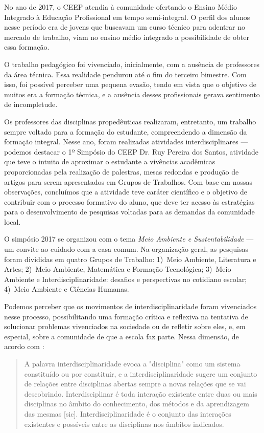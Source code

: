 \begin{refsection}
    No ano de 2017, o CEEP atendia à comunidade ofertando o Ensino Médio Integrado à Educação Profissional em tempo semi-integral. O perfil dos alunos nesse período era de jovens que buscavam um curso técnico para adentrar no mercado de trabalho, viam no ensino médio integrado a possibilidade de obter essa formação.

    O trabalho pedagógico foi vivenciado, inicialmente, com a ausência de professores da área técnica. Essa realidade pendurou até o fim do terceiro bimestre. Com isso, foi possível perceber uma pequena evasão, tendo em vista que o objetivo de muitos era a formação técnica, e a ausência desses profissionais gerava sentimento de incompletude.  

    Os professores das disciplinas propedêuticas realizaram, entretanto, um trabalho sempre voltado para a formação do estudante, compreendendo a dimensão da formação integral. Nesse ano, foram realizadas atividades interdisciplinares --- podemos destacar o 1º Simpósio do CEEP Dr. Ruy Pereira dos Santos, atividade que teve o intuito de aproximar o estudante a vivências acadêmicas proporcionadas pela realização de palestras, mesas redondas e produção de artigos para serem apresentados em Grupos de Trabalhos. Com base em nossas observações, concluímos que a atividade teve caráter científico e o objetivo de contribuir com o processo formativo do aluno, que deve ter acesso às estratégias para o desenvolvimento de pesquisas voltadas para as demandas da comunidade local.  

    O simpósio 2017 se organizou com o tema \textit{Meio Ambiente e Sustentabilidade} --- um convite ao cuidado com a casa comum. Na organização geral, as pesquisas foram divididas em quatro Grupos de Trabalho: 1)~Meio Ambiente, Literatura e Artes; 2)~Meio Ambiente, Matemática e Formação Tecnológica; 3)~Meio Ambiente e Interdisciplinaridade: desafios e perspectivas no cotidiano escolar; 4)~Meio Ambiente e Ciências Humanas. 

    Podemos perceber que os movimentos de interdisciplinaridade foram vivenciados nesse processo, possibilitando uma formação crítica e reflexiva na tentativa de solucionar problemas vivenciados na sociedade ou de refletir sobre eles, e, em especial, sobre a comunidade de que a escola faz parte. Nessa dimensão, de acordo com \textcite{YARED2008Interdisciplinaridade}:  

    \begin{quotation}
        A palavra interdisciplinaridade evoca a "disciplina" como um sistema constituído ou por constituir, e a interdisciplinaridade sugere um conjunto de relações entre disciplinas abertas sempre a novas relações que se vai descobrindo. Interdisciplinar é toda interação existente entre duas ou mais disciplinas no âmbito do conhecimento, dos métodos e da aprendizagem das mesmas [sic]. Interdisciplinaridade é o conjunto das interações existentes e possíveis entre as disciplinas nos âmbitos indicados. \cite[SUERO, 1986, p.~18--19 apud][p.~161]{YARED2008Interdisciplinaridade}
    \end{quotation}


\end{refsection}
